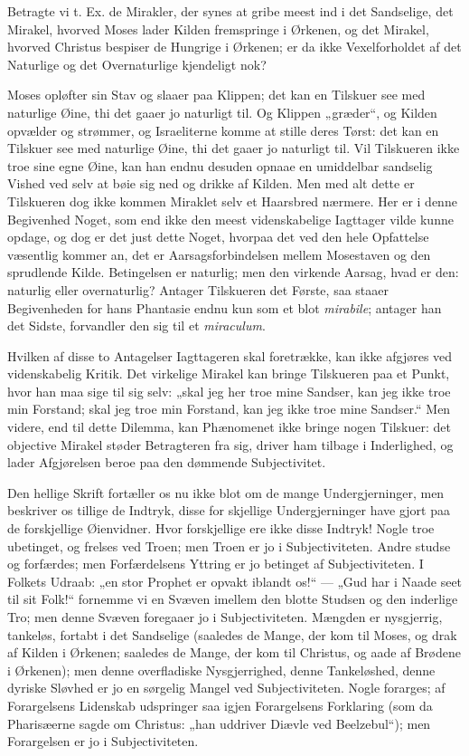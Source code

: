 \documentclass[12pt,a4paper]{book}
\newcommand{\opage}[1]{\marginnote{\footnotesize\textit{[#1]}}}
\begin{document}
Betragte vi t. Ex. de Mirakler, der synes at gribe meest
\opage{48} ind i det Sandselige, det Mirakel, hvorved Moses lader Kilden fremspringe i
Ørkenen, og det Mirakel, hvorved Christus bespiser de Hungrige i Ørkenen; er da
ikke Vexelforholdet af det Naturlige og det Overnaturlige kjendeligt nok?

Moses opløfter sin Stav og slaaer paa Klippen; det kan en Tilskuer see med
naturlige Øine, thi det gaaer jo naturligt til. Og Klippen „græder“, og Kilden
opvælder og strømmer, og Israeliterne komme at stille deres Tørst: det kan en
Tilskuer see med naturlige Øine, thi det gaaer jo naturligt til. Vil Tilskueren
ikke troe sine egne Øine, kan han endnu desuden opnaae en umiddelbar sandselig
Vished ved selv at bøie sig ned og drikke af Kilden. Men med alt dette er
Tilskueren dog ikke kommen Miraklet selv et Haarsbred nærmere. Her er i denne
Begivenhed Noget, som end ikke den meest videnskabelige Iagttager vilde kunne
opdage, og dog er det just dette Noget, hvorpaa det ved den hele Opfattelse
væsentlig kommer an, det er Aarsagsforbindelsen mellem Mosestaven og den
sprudlende Kilde. Betingelsen er naturlig; men den virkende Aarsag, hvad er
den: naturlig eller overnaturlig? Antager Tilskueren det Første, saa staaer
Begivenheden for hans Phantasie endnu kun som et blot \textit{mirabile};
antager han det Sidste, forvandler den sig til et \textit{miraculum}.

Hvilken af disse to Antagelser Iagttageren skal foretrække, kan ikke afgjøres
ved videnskabelig Kritik. Det virkelige Mirakel kan bringe Tilskueren paa et
Punkt, hvor han maa sige til sig selv: „skal jeg her troe mine Sandser, kan jeg
ikke troe min Forstand; skal jeg troe min Forstand, kan jeg ikke troe mine
Sandser.“ Men videre, end til dette Dilemma, kan Phænomenet ikke bringe nogen
Tilskuer: det objective Mirakel støder Betragteren fra sig, driver ham tilbage
i Inderlighed, og lader Afgjørelsen beroe paa den dømmende Subjectivitet.

Den hellige Skrift fortæller os nu ikke blot om de mange Undergjerninger, men
beskriver os tillige de Indtryk, disse for\-%
\opage{49}skjellige Undergjerninger have gjort paa de forskjellige Øienvidner. Hvor
forskjellige ere ikke disse Indtryk! Nogle troe ubetinget, og frelses ved
Troen; men Troen er jo i Subjectiviteten. Andre studse og forfærdes; men
Forfærdelsens Yttring er jo betinget af Subjectiviteten. I Folkets Udraab: „en
stor Prophet er opvakt iblandt os!“ --- „Gud har i Naade seet til sit Folk!“
fornemme vi en Svæven imellem den blotte Studsen og den inderlige Tro; men
denne Svæven foregaaer jo i Subjectiviteten. Mængden er nysgjerrig, tankeløs,
fortabt i det Sandselige (saaledes de Mange, der kom til Moses, og drak af
Kilden i Ørkenen; saaledes de Mange, der kom til Christus, og aade af Brødene i
Ørkenen); men denne overfladiske Nysgjerrighed, denne Tankeløshed, denne
dyriske Sløvhed er jo en sørgelig Mangel ved Subjectiviteten. Nogle forarges;
af Forargelsens Lidenskab udspringer saa igjen Forargelsens Forklaring (som da
Pharisæerne sagde om Christus: „han uddriver Diævle ved Beelzebul“); men
Forargelsen er jo i Subjectiviteten.
\end{document}
